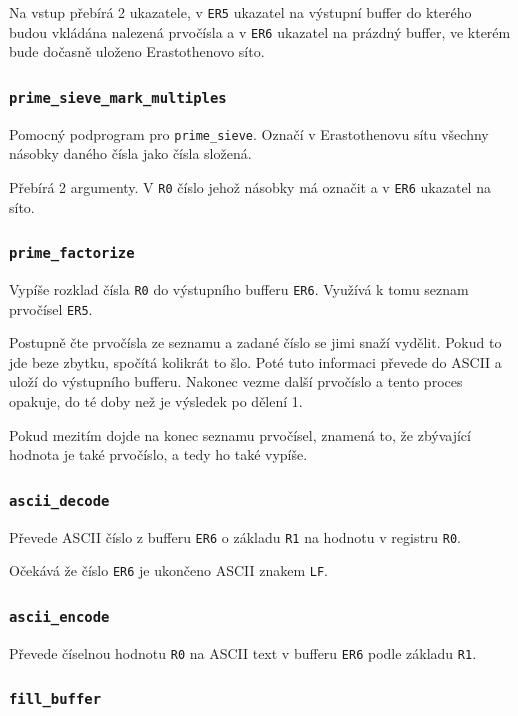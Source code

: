 \documentclass[12pt]{article}
\newcommand{\code}[1]{\mbox{\texttt{#1}}}
\begin{document}
Na vstup přebírá 2 ukazatele, v \code{ER5} ukazatel na výstupní buffer do kterého budou vkládána
nalezená prvočísla a v \code{ER6} ukazatel na prázdný buffer, ve kterém bude dočasně uloženo
Erastothenovo síto.

\subsubsection{\code{prime\_sieve\_mark\_multiples}}

Pomocný podprogram pro \code{prime\_sieve}. Označí v Erastothenovu sítu všechny násobky daného
čísla jako čísla složená.

Přebírá 2 argumenty. V \code{R0} číslo jehož násobky má označit a v \code{ER6} ukazatel na síto.

\subsubsection{\code{prime\_factorize}}

Vypíše rozklad čísla \code{R0} do výstupního bufferu \code{ER6}. Využívá k tomu seznam prvočísel
\code{ER5}.

Postupně čte prvočísla ze seznamu a zadané číslo se jimi snaží vydělit. Pokud to jde beze zbytku,
spočítá kolikrát to šlo. Poté tuto informaci převede do ASCII a uloží do výstupního bufferu.
Nakonec vezme další prvočíslo a tento proces opakuje, do té doby než je výsledek po dělení 1.

Pokud mezitím dojde na konec seznamu prvočísel, znamená to, že zbývající hodnota je také prvočíslo,
a tedy ho také vypíše.

\subsubsection{\code{ascii\_decode}}

Převede ASCII číslo z bufferu \code{ER6} o základu \code{R1} na hodnotu v registru \code{R0}.

Očekává že číslo \code{ER6} je ukončeno ASCII znakem \code{LF}.

\subsubsection{\code{ascii\_encode}}

Převede číselnou hodnotu \code{R0} na ASCII text v bufferu \code{ER6}
podle základu \code{R1}.

\subsubsection{\code{fill\_buffer}}
\end{document}
